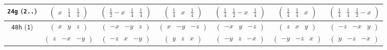 \documentclass[fleqn,9pt,landscape]{jsarticle}
\begin{document}
\begin{center}
\begin{longtable}{ccccccc}
{\tt 24g} ({\tt 2..}) & $ \begin{pmatrix} x & \frac{1}{4} & \frac{1}{4} \end{pmatrix} $ & $ \begin{pmatrix} \frac{1}{2} - x & \frac{1}{4} & \frac{1}{4} \end{pmatrix} $ & $ \begin{pmatrix} \frac{1}{4} & x & \frac{1}{4} \end{pmatrix} $ & $ \begin{pmatrix} \frac{1}{4} & \frac{1}{2} - x & \frac{1}{4} \end{pmatrix} $ & $ \begin{pmatrix} \frac{1}{4} & \frac{1}{4} & x \end{pmatrix} $ & $ \begin{pmatrix} \frac{1}{4} & \frac{1}{4} & \frac{1}{2} - x \end{pmatrix} $ \\ \hline
{\tt 48h} ({\tt 1}) & $ \begin{pmatrix} x & y & z \end{pmatrix} $ & $ \begin{pmatrix} - x & - y & z \end{pmatrix} $ & $ \begin{pmatrix} x & - y & - z \end{pmatrix} $ & $ \begin{pmatrix} - x & y & - z \end{pmatrix} $ & $ \begin{pmatrix} z & x & y \end{pmatrix} $ & $ \begin{pmatrix} - z & - x & y \end{pmatrix} $ \\
& $ \begin{pmatrix} z & - x & - y \end{pmatrix} $ & $ \begin{pmatrix} - z & x & - y \end{pmatrix} $ & $ \begin{pmatrix} y & z & x \end{pmatrix} $ & $ \begin{pmatrix} - y & z & - x \end{pmatrix} $ & $ \begin{pmatrix} - y & - z & x \end{pmatrix} $ & $ \begin{pmatrix} y & - z & - x \end{pmatrix} $ \\
\end{longtable}
\end{center}
\end{document}
